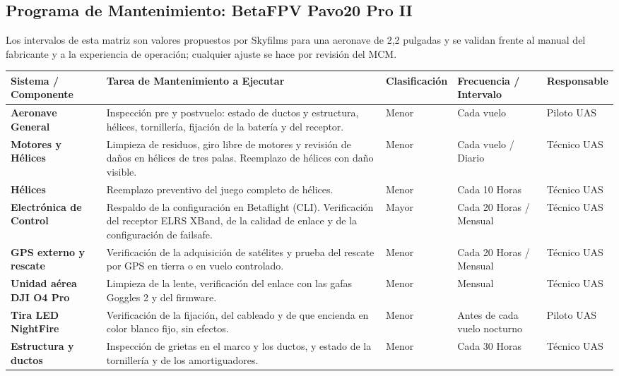 \subsection{Programa de Mantenimiento: BetaFPV Pavo20 Pro II}
Los intervalos de esta matriz son valores propuestos por Skyfilms para una aeronave de 2,2 pulgadas y se validan frente al manual del fabricante y a la experiencia de operación; cualquier ajuste se hace por revisión del MCM.
\begin{longtable}{|p{}|p{}|m{}|p{}|p{}|}
\hline
\rowcolor{gray!30}
\textbf{Sistema / Componente} & \textbf{Tarea de Mantenimiento a Ejecutar} & \textbf{Clasificación} & \textbf{Frecuencia / Intervalo} & \textbf{Responsable} \\ \hline
\endhead
\textbf{Aeronave General} & Inspección pre y postvuelo: estado de ductos y estructura, hélices, tornillería, fijación de la batería y del receptor. & Menor & Cada vuelo & Piloto UAS \\ \hline
\textbf{Motores y Hélices} & Limpieza de residuos, giro libre de motores y revisión de daños en hélices de tres palas. Reemplazo de hélices con daño visible. & Menor & Cada vuelo / Diario & Técnico UAS \\ \hline
\textbf{Hélices} & Reemplazo preventivo del juego completo de hélices. & Menor & Cada 10 Horas & Técnico UAS \\ \hline
\textbf{Electrónica de Control} & Respaldo de la configuración en Betaflight (CLI). Verificación del receptor ELRS XBand, de la calidad de enlace y de la configuración de failsafe. & Mayor & Cada 20 Horas / Mensual & Técnico UAS \\ \hline
\textbf{GPS externo y rescate} & Verificación de la adquisición de satélites y prueba del rescate por GPS en tierra o en vuelo controlado. & Menor & Cada 20 Horas / Mensual & Técnico UAS \\ \hline
\textbf{Unidad aérea DJI O4 Pro} & Limpieza de la lente, verificación del enlace con las gafas Goggles 2 y del firmware. & Menor & Mensual & Técnico UAS \\ \hline
\textbf{Tira LED NightFire} & Verificación de la fijación, del cableado y de que encienda en color blanco fijo, sin efectos. & Menor & Antes de cada vuelo nocturno & Piloto UAS \\ \hline
\textbf{Estructura y ductos} & Inspección de grietas en el marco y los ductos, y estado de la tornillería y de los amortiguadores. & Menor & Cada 30 Horas & Técnico UAS \\ \hline

\end{longtable}
